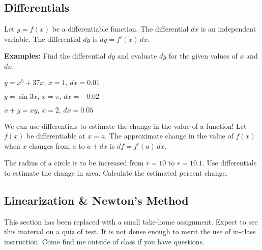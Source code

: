 \documentclass[addpoints, 12pt]{exam}
\begin{document}

\newpage
{}
\subsection*{Differentials}
\begin{tcolorbox}[title= DEFINITION OF A DIFFERENTIAL,black,sharp corners,colback=white,colbacktitle=white,coltitle=black,boxrule=1pt]

    Let $y=f(x)$ be a differentiable function. The differential $dx$ is an independent variable. The differential $dy$ is $dy=f'(x)\,dx$.
    
\end{tcolorbox}
\noindent\textbf{Examples:} Find the differential $dy$ and evaluate $dy$ for the given values of $x$ and $dx$.
\begin{questions}
    \question $y=x^5+37x,\,x=1,\,dx=0.01$
    
    \question $y=\sin3x,\,x=\pi,\,dx=-0.02$
    
    \question $x+y=xy,\,x=2,\,dx=0.05$
\end{questions}

We can use differentials to estimate the change in the value of a function! Let $f(x)$ be differentiable at $x=a$. The approximate change in the value of $f(x)$ when $x$ changes from $a$ to $a+dx$ is $df=f'(a)\,dx$.
\begin{questions}
    \setcounter{question}{3}
    \question The radius of a circle is to be increased from $r=10$ to $r=10.1$. Use differentials to estimate the change in area. Calculate the estimated percent change.
\end{questions}

\subsection*{Linearization \& Newton's Method}
This section has been replaced with a small take-home assignment. Expect to see this material on a quiz of test. It is not dense enough to merit the use of in-class instruction. Come find me outside of class if you have questions.
\end{document}
